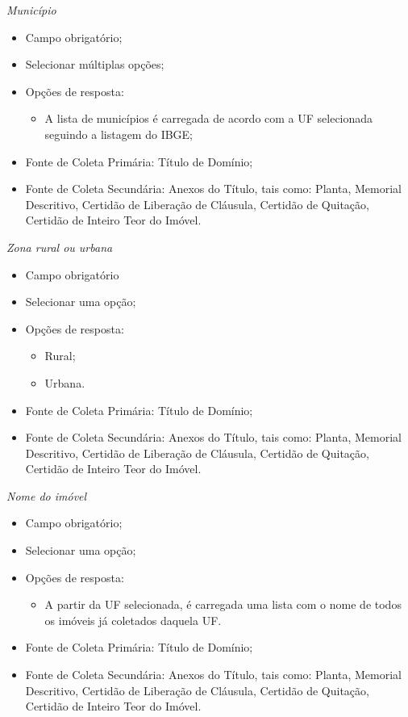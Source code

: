 \documentclass[
  letterpaper,
]{report}
\providecommand{\tightlist}{%
  \setlength{\itemsep}{0pt}\setlength{\parskip}{0pt}}\usepackage{longtable,booktabs,array}
\begin{document}
\emph{Município}

\begin{itemize}
\tightlist
\item
  Campo obrigatório;
\item
  Selecionar múltiplas opções;
\item
  Opções de resposta:

  \begin{itemize}
  \tightlist
  \item
    A lista de municípios é carregada de acordo com a UF selecionada
    seguindo a listagem do IBGE;
  \end{itemize}
\item
  Fonte de Coleta Primária: Título de Domínio;
\item
  Fonte de Coleta Secundária: Anexos do Título, tais como: Planta,
  Memorial Descritivo, Certidão de Liberação de Cláusula, Certidão de
  Quitação, Certidão de Inteiro Teor do Imóvel.
\end{itemize}

\emph{Zona rural ou urbana}

\begin{itemize}
\tightlist
\item
  Campo obrigatório
\item
  Selecionar uma opção;
\item
  Opções de resposta:

  \begin{itemize}
  \tightlist
  \item
    Rural;
  \item
    Urbana.
  \end{itemize}
\item
  Fonte de Coleta Primária: Título de Domínio;
\item
  Fonte de Coleta Secundária: Anexos do Título, tais como: Planta,
  Memorial Descritivo, Certidão de Liberação de Cláusula, Certidão de
  Quitação, Certidão de Inteiro Teor do Imóvel.
\end{itemize}

\emph{Nome do imóvel}

\begin{itemize}
\tightlist
\item
  Campo obrigatório;
\item
  Selecionar uma opção;
\item
  Opções de resposta:

  \begin{itemize}
  \tightlist
  \item
    A partir da UF selecionada, é carregada uma lista com o nome de
    todos os imóveis já coletados daquela UF.
  \end{itemize}
\item
  Fonte de Coleta Primária: Título de Domínio;
\item
  Fonte de Coleta Secundária: Anexos do Título, tais como: Planta,
  Memorial Descritivo, Certidão de Liberação de Cláusula, Certidão de
  Quitação, Certidão de Inteiro Teor do Imóvel.
\end{itemize}
\end{document}
